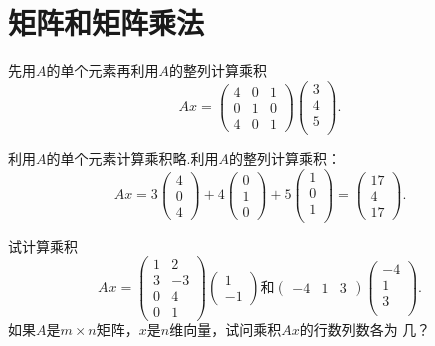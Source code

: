 ﻿\documentclass{book} \usepackage{exsheets} \usepackage{xeCJK}
\begin{document}
\section{矩阵和矩阵乘法}
\begin{question}
  先用$A$的单个元素再利用$A$的整列计算乘积
$$
Ax=
\begin{pmatrix}
  4&0&1\\
  0&1&0\\
  4&0&1
\end{pmatrix}
\begin{pmatrix}
  3\\
  4\\
  5\\
\end{pmatrix}.
$$
\end{question}
\begin{solution}
  利用$A$的单个元素计算乘积略.利用$A$的整列计算乘积：
$$
Ax=3
\begin{pmatrix}
  4\\
  0\\
  4
\end{pmatrix}+4
\begin{pmatrix}
  0\\
  1\\
  0
\end{pmatrix}+5
\begin{pmatrix}
  1\\
  0\\
  1\\
\end{pmatrix}=
\begin{pmatrix}
  17\\
  4\\
  17
\end{pmatrix}.
$$
\end{solution}
\begin{question}
  试计算乘积
$$
Ax=
\begin{pmatrix}
  1&2\\
  3&-3\\
  0&4\\
  0&1
\end{pmatrix}
\begin{pmatrix}
  1\\
  -1
\end{pmatrix}\mbox{和}
\begin{pmatrix}
  -4&1&3
\end{pmatrix}
\begin{pmatrix}
  -4\\
  1\\
  3\\
\end{pmatrix}.
$$
如果$A$是$m\times n$矩阵，$x$是$n$维向量，试问乘积$Ax$的行数列数各为
几？
\end{question}
\end{document}
